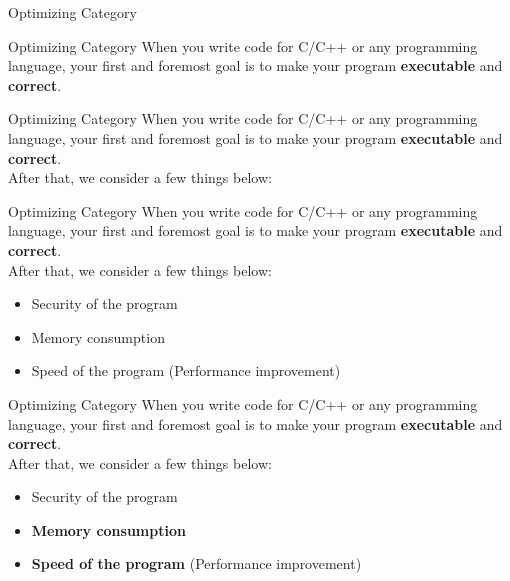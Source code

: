\documentclass[aspectratio=169,xcolor=dvipsnames]{beamer}
\begin{document}
\begin{frame}{Optimizing Category}
    
\end{frame}
\begin{frame}{Optimizing Category}
    When you write code for C/C++ or any programming language, your first and foremost goal is to make your program \textbf{executable} and \textbf{correct}.\\[1.0cm]
\end{frame}
\begin{frame}{Optimizing Category}
    When you write code for C/C++ or any programming language, your first and foremost goal is to make your program \textbf{executable} and \textbf{correct}.\\[1.0cm]
    After that, we consider a few things below:
\end{frame}
\begin{frame}{Optimizing Category}
    When you write code for C/C++ or any programming language, your first and foremost goal is to make your program \textbf{executable} and \textbf{correct}.\\[1.0cm]
    After that, we consider a few things below:
    \begin{itemize}
        \item Security of the program
        \item Memory consumption
        \item Speed of the program (Performance improvement)
    \end{itemize}
\end{frame}
\begin{frame}{Optimizing Category}
    When you write code for C/C++ or any programming language, your first and foremost goal is to make your program \textbf{executable} and \textbf{correct}.\\[1.0cm]
    After that, we consider a few things below:
    \begin{itemize}
        \item Security of the program
        \item \textbf{Memory consumption}
        \item \textbf{Speed of the program} (Performance improvement)
    \end{itemize}
\end{frame}
\end{document}
